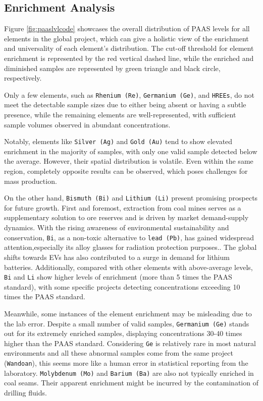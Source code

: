 \documentclass[11pt,a4paper,]{article}
\begin{document}
\subsection{Enrichment Analysis}\label{enrichment-analysis-1}

Figure \ref{fig:paaslvlcode} showcases the overall distribution of PAAS levels for all elements in the global project, which can give a holistic view of the enrichment and universality of each element's distribution. The cut-off threshold for element enrichment is represented by the red vertical dashed line, while the enriched and diminished samples are represented by green triangle and black circle, respectively.

Only a few elements, such as \texttt{Rhenium\ (Re)}, \texttt{Germanium\ (Ge)}, and \texttt{HREEs}, do not meet the detectable sample sizes due to either being absent or having a subtle presence, while the remaining elements are well-represented, with sufficient sample volumes observed in abundant concentrations.

Notably, elements like \texttt{Silver\ (Ag)} and \texttt{Gold\ (Au)} tend to show elevated enrichment in the majority of samples, with only one valid sample detected below the average. However, their spatial distribution is volatile. Even within the same region, completely opposite results can be observed, which poses challenges for mass production.

On the other hand, \texttt{Bismuth\ (Bi)} and \texttt{Lithium\ (Li)} present promising prospects for future growth. First and foremost, extraction from coal mines serves as a supplementary solution to ore reserves and is driven by market demand-supply dynamics. With the rising awareness of environmental sustainability and conservation, \texttt{Bi}, as a non-toxic alternative to \texttt{lead\ (Pb)}, has gained widespread attention,especially its alloy glasses for radiation protection purposes.\autocite{Buriahi2021}. The global shifts towards EVs has also contributed to a surge in demand for lithium batteries. Additionally, compared with other elements with above-average levels, \texttt{Bi} and \texttt{Li} show higher levels of enrichment (more than 5 times the PAAS standard), with some specific projects detecting concentrations exceeding 10 times the PAAS standard.

Meanwhile, some instances of the element enrichment may be misleading due to the lab error. Despite a small number of valid samples, \texttt{Germanium\ (Ge)} stands out for its extremely enriched samples, displaying concentrations 30-40 times higher than the PAAS standard. Considering \texttt{Ge} is relatively rare in most natural environments and all these abnormal samples come from the same project (\texttt{Wandoan}), this seems more like a human error in statistical reporting from the laboratory. \texttt{Molybdenum\ (Mo)} and \texttt{Barium\ (Ba)} are also not typically enriched in coal seams. Their apparent enrichment might be incurred by the contamination of drilling fluids.
\end{document}
